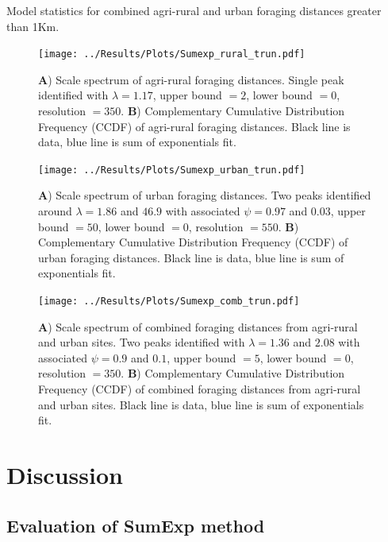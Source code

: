 \documentclass[11pt,usenames,dvipsnames]{article}
\begin{document}
\begin{table}[H]
	\centering
	\caption{Model statistics for combined agri-rural and urban foraging distances greater than 1Km.}
	
\end{table}

\begin{figure}[H]
	\centering
	\texttt{[image: ../Results/Plots/Sumexp\_rural\_trun.pdf]}
	\caption{\textbf{A}) Scale spectrum of agri-rural foraging distances. Single peak identified with $\lambda = 1.17$, upper bound $= 2$, lower bound $= 0$, resolution $= 350$. \textbf{B}) Complementary Cumulative Distribution Frequency (CCDF) of agri-rural foraging distances. Black line is data, blue line is sum of exponentials fit.}
\end{figure}

\begin{figure}[H]
	\centering
	\texttt{[image: ../Results/Plots/Sumexp\_urban\_trun.pdf]}
	\caption{\textbf{A}) Scale spectrum of urban foraging distances. Two peaks identified around $\lambda = 1.86$ and $46.9$ with associated $\psi = 0.97$ and $0.03$, upper bound $= 50$, lower bound $= 0$, resolution $= 550$. \textbf{B}) Complementary Cumulative Distribution Frequency (CCDF) of urban foraging distances. Black line is data, blue line is sum of exponentials fit.}
\end{figure}

\begin{figure}[H]
	\centering
	\texttt{[image: ../Results/Plots/Sumexp\_comb\_trun.pdf]}
	\caption{\textbf{A}) Scale spectrum of combined foraging distances from agri-rural and urban sites. Two peaks identified with $\lambda = 1.36$ and $2.08$ with associated $\psi = 0.9$ and $0.1$, upper bound $=5$, lower bound $= 0$, resolution $= 350$. \textbf{B}) Complementary Cumulative Distribution Frequency (CCDF) of combined foraging distances from agri-rural and urban sites. Black line is data, blue line is sum of exponentials fit.}
\end{figure}

\section{Discussion}

\subsection{Evaluation of SumExp method}
\end{document}

